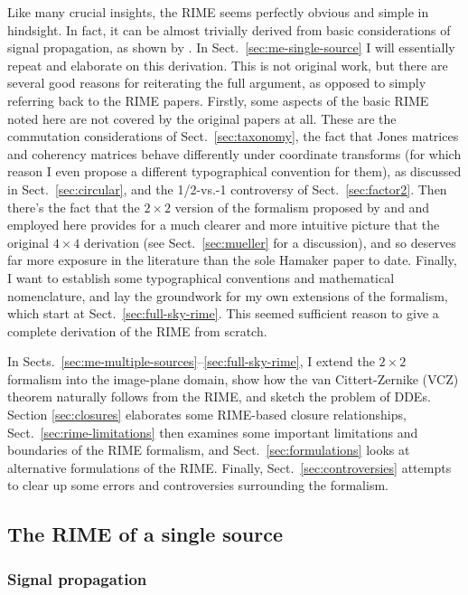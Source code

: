 \documentclass[]{aa}
\begin{document}
Like many crucial insights, the RIME seems perfectly obvious and simple in hindsight. In fact, it can be almost trivially derived from basic considerations of signal propagation, as shown by \citet{ME1}. In Sect.~\ref{sec:me-single-source} I will essentially repeat and elaborate on this derivation. This is not original work, but there are several good reasons for reiterating the full argument, as opposed to simply referring back to the RIME papers. Firstly, some aspects of the basic RIME noted here are not covered by the original papers at all. These are the commutation considerations of Sect.~\ref{sec:taxonomy}, the fact that Jones matrices and coherency matrices behave differently under coordinate transforms (for which reason I even propose a different typographical convention for them), as discussed in Sect.~\ref{sec:circular}, and the 1/2-vs.-1 controversy of Sect.~\ref{sec:factor2}. Then there's the fact that the $2\times2$ version of the formalism proposed by \citet{ME4} and and employed here provides for a much clearer and more intuitive picture that the original $4\times4$ derivation (see Sect.~\ref{sec:mueller} for a discussion), and so deserves far more exposure in the literature than the sole Hamaker paper to date. Finally, I want to establish some typographical conventions and mathematical nomenclature, and lay the groundwork for my own extensions of the formalism, which start at Sect.~\ref{sec:full-sky-rime}. This seemed sufficient reason to give a complete derivation of the RIME from scratch.

In Sects.~\ref{sec:me-multiple-sources}--\ref{sec:full-sky-rime}, I extend the $2\times2$ formalism into the image-plane domain, show how the van Cittert-Zernike (VCZ) theorem naturally follows from the RIME, and sketch the problem of DDEs. Section \ref{sec:closures} elaborates some RIME-based closure relationships, Sect.~\ref{sec:rime-limitations} then examines some important limitations and boundaries of the RIME formalism, and Sect.~\ref{sec:formulations} looks at alternative formulations of the RIME. Finally, Sect.~\ref{sec:controversies} attempts to clear up some errors and controversies surrounding the formalism.

\subsection{The RIME of a single source\label{sec:me-single-source}}

\subsubsection{Signal propagation}
\end{document}
